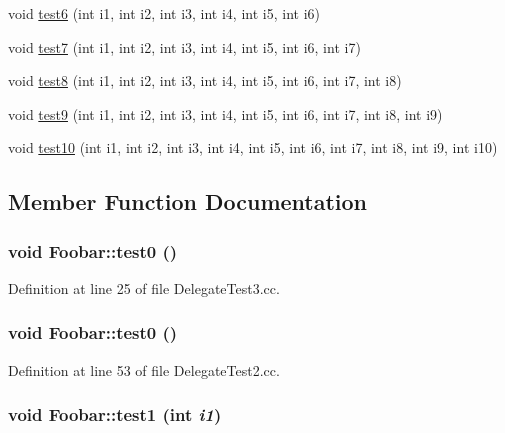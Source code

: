 \begin{CompactItemize}
void \hyperlink{structFoobar_a17}{test6} (int i1, int i2, int i3, int i4, int i5, int i6)
\item 
void \hyperlink{structFoobar_a18}{test7} (int i1, int i2, int i3, int i4, int i5, int i6, int i7)
\item 
void \hyperlink{structFoobar_a19}{test8} (int i1, int i2, int i3, int i4, int i5, int i6, int i7, int i8)
\item 
void \hyperlink{structFoobar_a20}{test9} (int i1, int i2, int i3, int i4, int i5, int i6, int i7, int i8, int i9)
\item 
void \hyperlink{structFoobar_a21}{test10} (int i1, int i2, int i3, int i4, int i5, int i6, int i7, int i8, int i9, int i10)
\end{CompactItemize}


\subsection{Member Function Documentation}
\hypertarget{structFoobar_a11}{
\subsubsection[test0]{\setlength{\rightskip}{0pt plus 5cm}void Foobar::test0 ()}}
\label{structFoobar_a11}




Definition at line 25 of file Delegate\-Test3.cc.\hypertarget{structFoobar_a0}{
\subsubsection[test0]{\setlength{\rightskip}{0pt plus 5cm}void Foobar::test0 ()}}
\label{structFoobar_a0}




Definition at line 53 of file Delegate\-Test2.cc.\hypertarget{structFoobar_a12}{
\subsubsection[test1]{\setlength{\rightskip}{0pt plus 5cm}void Foobar::test1 (int {\em i1})}}
\label{structFoobar_a12}





